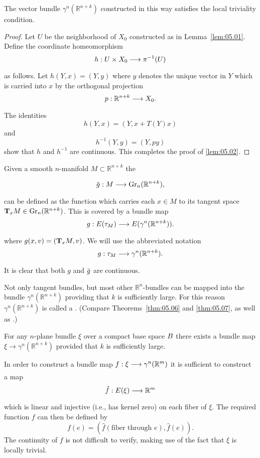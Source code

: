 \documentclass[../main]{subfiles}
\begin{document}
\begin{lemma}\label{lem:05.02}
	The vector bundle $\gamma^{n}(\mathbb{R}^{n+k})$ constructed in this way satisfies the local triviality condition.
\end{lemma}
\begin{proof}
	Let $U$ be the neighborhood of $X_{0}$ constructed as in Lemma~\ref{lem:05.01}. Define the coordinate homeomorphism
	\[h:U\times X_0\varrightarrow{}\pi\inv (U)
	\]
	as follows. Let $h(Y, x)=(Y, y)$ where $y$ denotes the unique vector in $Y$ which is carried into $x$ by the orthogonal projection
	\[p:\mathbb{R}^{n+k} \varrightarrow{}X_{0}. 
	\]
	The identities
	\[
	h(Y, x)=(Y, x+T(Y) x)
	\]
	and
	\[
	h^{-1}(Y, y)=(Y, py)
	\]
show that $h$ and $h^{-1}$ are continuous. This completes the proof of \ref{lem:05.02}.
\end{proof}

Given a smooth $n$-manifold $M \subset \mathbb{R}^{n+k}$ the 

\[\map{\xoverline{g}}{M}{\grassmannian_n (\mathbb{R}^{n+k})},
\]
can be defined as the function which carries each $x \in M$ to its tangent space $\tangentspace{M}{x} \in \grassmannian_n (\mathbb{R}^{n+k})$. This is covered by a bundle map
\[\map{g}{\total(\tangentbundle{M})}{\total(\gamma^{n}(\mathbb{R}^{n+k}))}.
\]
where $g(x, v)=(\tangentspace{M}{x}, v) $. We will use the abbreviated notation
\[\map{g}{\tangentbundle{M}}{\gamma^{n}(\mathbb{R}^{n+k})}.
\]
It is clear that both $g$ and $\xoverline{g}$ are continuous.

Not only tangent bundles, but most other $\mathbb{R}^{n}$-bundles can be mapped into the bundle $\gamma^{n}(\mathbb{R}^{n+k})$ providing that $k$ is sufficiently large. For this reason $\gamma^{n}(\mathbb{R}^{n+k})$ is called a . (Compare Theorems~\ref{thm:05.06} and \ref{thm:05.07}, as well as \cite[$\S$ 19]{steenrod1951}.)

\begin{lemma}\label{lem:05.03}
	For any $n$-plane bundle $\xi$ over a compact base space $\B $ there exists a bundle map $\xi \rightarrow \gamma^{n}(\mathbb{R}^{n+k})$ provided that $k$ is sufficiently large.
\end{lemma}

In order to construct a bundle map $\map{f}{\xi}{\gamma^{n}(\mathbb{R}^{m})}$ it is sufficient to construct a map
\[\map{\hat{f}}{\total(\xi)}{\mathbb{R}^{m}}
\]
which is linear and injective (i.e., has kernel zero) on each fiber of $\xi$. The required function $f$ can then be defined by
\[
f(e)=(\hat{f} (\text{fiber through } e), \hat{f}(e)).
\]
The continuity of $f$ is not difficult to verify, making use of the fact that $\xi$ is locally trivial.
\end{document}
